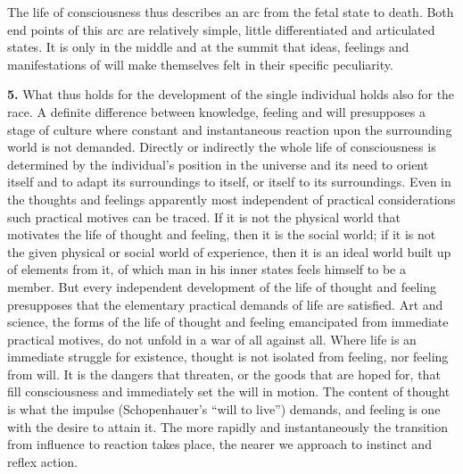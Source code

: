 \documentclass[12pt,a4paper]{book}
\newcommand{\opage}[1]{\marginnote{\footnotesize\textit{[#1]}}}
\begin{document}
\opage{110}The life of consciousness thus describes an arc from the fetal
state to death. Both end points of this arc are relatively simple,
little differentiated and articulated states. It is only in the middle
and at the summit that ideas, feelings and manifestations of will make
themselves felt in their specific peculiarity.

\textbf{5.} What thus holds for the development of the single individual
holds also for the race. A definite difference between knowledge,
feeling and will presupposes a stage of culture where constant and
instantaneous reaction upon the surrounding world is not demanded.
Directly or indirectly the whole life of consciousness is determined by
the individual's position in the universe and its need to orient itself
and to adapt its surroundings to itself, or itself to its surroundings.
Even in the thoughts and feelings apparently most independent of
practical considerations such practical motives can be traced. If it is
not the physical world that motivates the life of thought and feeling,
then it is the social world; if it is not the given physical or social
world of experience, then it is an ideal world built up of elements from
it, of which man in his inner states feels himself to be a member. But
every independent development of the life of thought and feeling
presupposes that the elementary practical demands of life are satisfied.
Art and science, the forms of the life of thought and feeling
emancipated from immediate practical motives, do not unfold in a war of
all against all. Where life is an immediate struggle for existence,
thought is not isolated from feeling, nor feeling from will. It is the
dangers that threaten, or the goods that are hoped for, that fill
consciousness and immediately set the will in motion. The content of
thought is what the impulse (Schopenhauer's ``will to live'') demands,
and feeling is one with the desire to attain it. The more rapidly and
instantaneously the transition from influence to reaction takes place,
the nearer we approach to instinct and reflex action.
\end{document}
